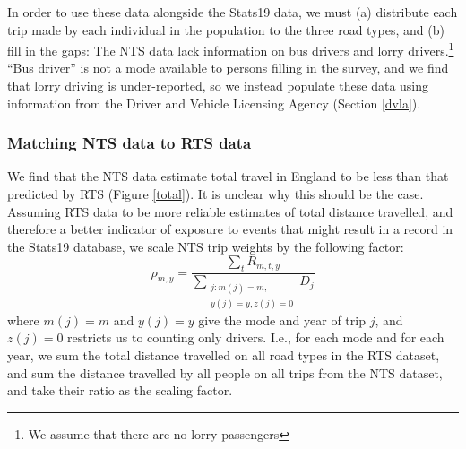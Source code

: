\documentclass{article}
\begin{document}
In order to use these data alongside the Stats19 data, we must (a) distribute each trip made by each individual in the population to the three road types, and (b) fill in the gaps: The NTS data lack information on bus drivers and lorry drivers.\footnote{We assume that there are no lorry passengers} ``Bus driver'' is not a mode available to persons filling in the survey, and we find that lorry driving is under-reported, so we instead populate these data using information from the Driver and Vehicle Licensing Agency (Section \ref{dvla}).

\subsubsection{Matching NTS data to RTS data}\label{match}

We find that the NTS data estimate total travel in England to be less than that predicted by RTS (Figure \ref{total}). It is unclear why this should be the case. Assuming RTS data to be more reliable estimates of total distance travelled, and therefore a better indicator of exposure to events that might result in a record in the Stats19 database, we scale NTS trip weights by the following factor:
 $$\rho_{m,y}=\frac{\sum_{t}R_{m,t,y}}{\sum_{\substack{j:m(j)=m,\\
                  y(j)=y,z(j)=0}}D_{j}}$$ 
where $m(j)=m$ and $y(j)=y$ give the mode and year of trip $j$, and $z(j)=0$ restricts us to counting only drivers. I.e., for each mode and for each year, we sum the total distance travelled on all road types in the RTS dataset, and sum the distance travelled by all people on all trips from the NTS dataset, and take their ratio as the scaling factor.
\end{document}
